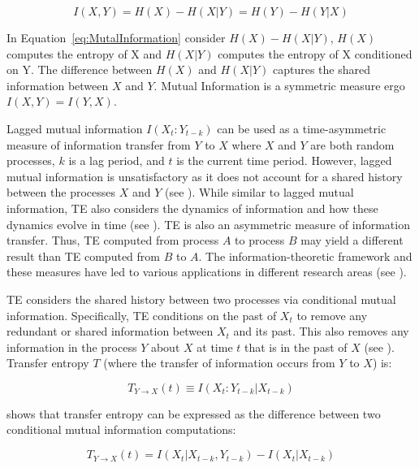 \begin{equation}
\label{eq:MutalInformation}
I(X,Y) = H(X) - H(X|Y) = H(Y) - H(Y|X)
\end{equation}

\noindent In Equation~\ref{eq:MutalInformation} consider \(H(X) - H(X|Y)\),  \(H(X)\) computes the entropy of X and \(H(X|Y)\) computes the entropy of X conditioned on Y. The difference between \(H(X)\) and \(H(X|Y)\) captures the shared information between \(X\) and \(Y\). Mutual Information is a symmetric measure ergo \(I(X,Y) = I(Y,X)\).

Lagged mutual information \(I(X_t : Y_{t-k})\) can be used as a time-asymmetric measure of information transfer from \(Y\) to \(X\) where \(X\) and \(Y\) are both random processes, \(k\) is a lag period, and \(t\) is the current time period. However, lagged mutual information is unsatisfactory as it does not account for a shared history between the processes \(X\) and \(Y\) (see \cite{MIdiffTE}). While similar to lagged mutual information,  TE also considers the dynamics of information and how these dynamics evolve in time (see \cite{IntroToTransferEntropy}).  TE is also an asymmetric measure of information transfer. Thus, TE computed from process \(A\) to process \(B\) may yield a different result than TE computed from \(B\) to \(A\). The information-theoretic framework and these measures have led to various applications in different research areas (see \cite{TEBook}).

TE considers the shared history between two processes via conditional mutual information. Specifically, TE conditions on the past of \(X_t\) to remove any redundant or shared information between \(X_t\) and its past. This also removes any information in the process \(Y\) about \(X\) at time \(t\) that is in the past of \(X\) (see \cite{b359}).  Transfer entropy \(T\) (where the transfer of information occurs from \(Y\) to \(X\)) is:

\begin{equation}
T_{Y \rightarrow X} (t) \equiv I(X_t: Y_{t-k} |  X_{t-k})
\end{equation}

\noindent \cite{kraskovEstimator} shows that transfer entropy can be expressed as the difference between two conditional mutual information computations: 

\begin{equation}  \label{eq:TE-MI-Diff}
T_{Y \rightarrow X}(t) = I(X_t | X_{t-k}, Y_{t-k}) -  I(X_t | X_{t-k}) 
 \end{equation} 

